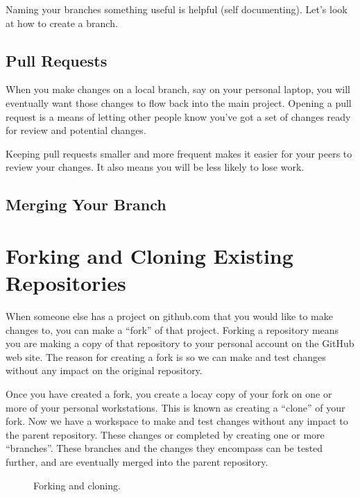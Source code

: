 \justify{}
Naming your branches something useful is helpful (self documenting). Let's look at how to create a branch.

\subsection{Pull Requests}

\justify{}
When you make changes on a local branch, say on your personal laptop, you will eventually want those changes
to flow back into the main project. Opening a pull request is a means of letting other
people know you've got a set of changes ready for review and potential changes.

\justify{}
Keeping pull requests smaller and more frequent makes it easier for your
peers to review your changes. It also means you will be less likely to lose work.

\subsection{Merging Your Branch}


\section{Forking and Cloning Existing Repositories}

\justify{}
When someone else has a project on github.com that you would like to make changes to, you can make a ``fork'' of that project.
Forking a repository means you are making a copy of that repository to your personal account on the GitHub web
site. The reason for creating a fork is so we can make and test changes without any impact on the original repository.

\justify{}
Once you have created a fork, you create a locay copy of your fork on one or more of your personal workstations. This is
known as creating a ``clone'' of your fork. Now we have a workspace to make and test changes without
any impact to the parent repository. These changes or completed by creating one or more ``branches''. These branches and the
changes they encompass can be tested further, and are eventually merged into the parent repository.

\begin{figure}[!htb]
\centering

\caption{Forking and cloning.}
\label{forkandclone}
\end{figure}

